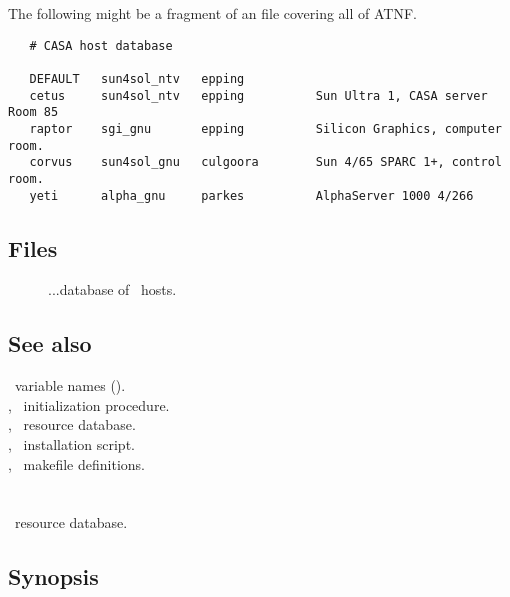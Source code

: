The following might be a fragment of an  file covering all
of ATNF.

\begin{verbatim}
   # CASA host database

   DEFAULT   sun4sol_ntv   epping
   cetus     sun4sol_ntv   epping          Sun Ultra 1, CASA server Room 85
   raptor    sgi_gnu       epping          Silicon Graphics, computer room.
   corvus    sun4sol_gnu   culgoora        Sun 4/65 SPARC 1+, control room.
   yeti      alpha_gnu     parkes          AlphaServer 1000 4/266
\end{verbatim}

\subsection*{Files}

\begin{description}
\item[]
...database of \aipspp\ hosts.
\end{description}

\subsection*{See also}

\aipspp\ variable names ().\\
, \aipspp\ initialization procedure.\\
, \aipspp\ resource database.\\
, \aipspp\ installation script.\\
, \aipspp\ makefile definitions.


\newpage
\section{}
\label{aipsrc}

\aipspp\ resource database.

\subsection*{Synopsis}

